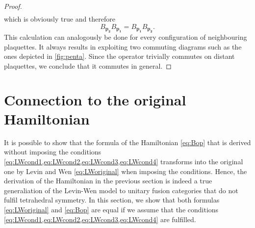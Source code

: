 \begin{proof}
\begin{align}
		\end{align}
	which is obviously true and therefore
		\begin{equation}
			B_\mathbf{p_2}B_\mathbf{p_1}=B_\mathbf{p_1}B_\mathbf{p_2}.
		\end{equation}
	This calculation can analogously be done for every configuration of neighbouring plaquettes. It always results in exploiting two commuting diagrams such as the ones depicted in \cref{fig:penta}. Since the operator trivially commutes on distant plaquettes, we conclude that it commutes in general.
\end{proof}



\section{Connection to the original Hamiltonian}
\label{sec:originalHam}

It is possible to show that the formula of the Hamiltonian \cref{eq:Bop} that is derived without imposing the conditions \cref{eq:LWcond1,eq:LWcond2,eq:LWcond3,eq:LWcond4} transforms into the original one by Levin and Wen \cref{eq:LWoriginal} when imposing the conditions. Hence, the derivation of the Hamiltonian in the previous section is indeed a true generaliation of the Levin-Wen model to unitary fusion categories that do not fulfil tetrahedral symmetry. In this section, we show that both formulas \cref{eq:LWoriginal} and \cref{eq:Bop} are equal if we assume that the conditions \cref{eq:LWcond1,eq:LWcond2,eq:LWcond3,eq:LWcond4} are fulfilled.

